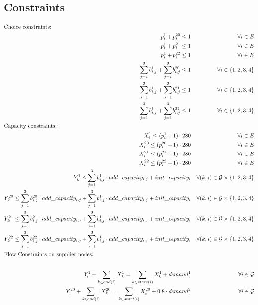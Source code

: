 \documentclass{article}
\begin{document}
	\subsection*{Constraints}
	\begin{align*}
		\intertext{Choice constraints:}
		p^1_i +p^{20}_i  \leq 1 && \forall i\in E\\
		p^1_i +p^{21}_i  \leq 1 && \forall i\in E\\
		p^1_i +p^{22}_i  \leq 1 && \forall i\in E\\
		\sum_{j = 1}^{3} b^1_{i,j} + \sum_{j = 1}^{3} b^{20}_{i,j} \leq 1 && \forall i \in \{1,2,3,4\} \\
		\sum_{j = 1}^{3} b^1_{i,j} + \sum_{j = 1}^{3} b^{21}_{i,j} \leq 1 && \forall i \in \{1,2,3,4\} \\
		\sum_{j = 1}^{3} b^1_{i,j} + \sum_{j = 1}^{3} b^{22}_{i,j} \leq 1 && \forall i \in \{1,2,3,4\} \\
		\intertext{Capacity constraints:}
		X^1_i \leq (p^1_i + 1)\cdot 280 && \forall i\in E\\
		X^{20}_i \leq (p^{20}_i + 1)\cdot 280 && \forall i\in E\\
		X^{21}_i \leq (p^{21}_i + 1)\cdot 280 && \forall i\in E\\
		X^{22}_i \leq (p^{22}_i + 1)\cdot 280 && \forall i\in E\\
		Y^1_k \leq \sum_{j = 1}^{3} b^1_{i,j} \cdot add\_capacity_{i,j} + init\_capacity_i  && \forall (k,i) \in \mathcal{G} \times \{1,2,3,4\}\\
		Y^{20}_k \leq \sum_{j = 1}^{3} b^{20}_{i,j} \cdot add\_capacity_{i,j}+\sum_{j = 1}^{3} b^1_{i,j} \cdot add\_capacity_{i,j} + init\_capacity_i  && \forall (k,i) \in \mathcal{G} \times \{1,2,3,4\}  \\
		Y^{21}_k \leq \sum_{j = 1}^{3} b^{21}_{i,j} \cdot add\_capacity_{i,j}+\sum_{j = 1}^{3} b^1_{i,j} \cdot add\_capacity_{i,j} + init\_capacity_i  && \forall (k,i) \in \mathcal{G} \times \{1,2,3,4\} \\
		Y^{22}_k \leq \sum_{j = 1}^{3} b^{22}_{i,j} \cdot add\_capacity_{i,j}+\sum_{j = 1}^{3} b^1_{i,j} \cdot add\_capacity_{i,j} + init\_capacity_i  && \forall (k,i) \in \mathcal{G} \times \{1,2,3,4\} \\
		\intertext{Flow Constraints on supplier nodes:}\\ Y^1_i + \sum_{k \in end(i)} X^{1}_{k} =
		\sum_{k \in start(i)} X^{1}_{k} + demand^{1}_{i} &&\forall i\in \mathcal{G} \\
		Y^{20}_i + \sum_{k \in end(i)} X^{20}_{k} =
		\sum_{k \in start(i)} X^{20}_{k} + 0.8 \cdot demand^{2}_{i} &&\forall i\in \mathcal{G} \\

\end{align*}
\end{document}
